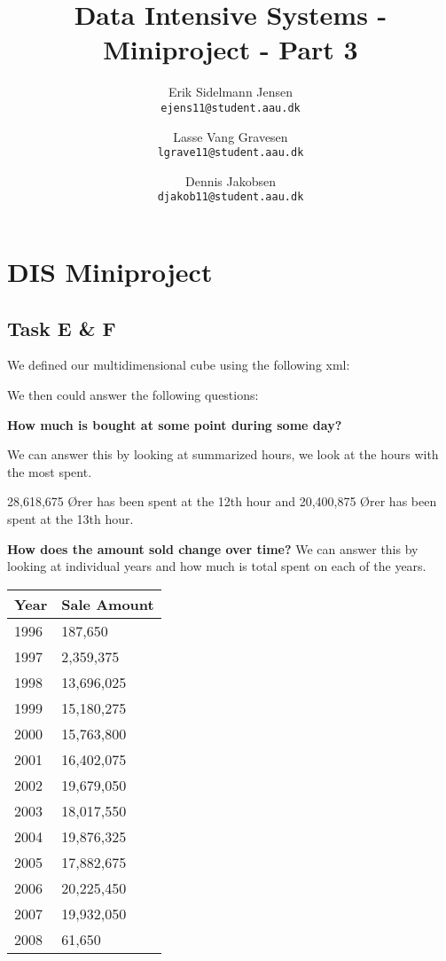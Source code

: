 
\usepackage{subcaption}

\author{
  Erik Sidelmann Jensen\\
  \texttt{ejens11@student.aau.dk}
  \and
  Lasse Vang Gravesen\\
  \texttt{lgrave11@student.aau.dk}
  \and
  Dennis Jakobsen\\
  \texttt{djakob11@student.aau.dk}  
}

\title{Data Intensive Systems - Miniproject - Part 3}
\date{}


	\clearpage\maketitle
	\thispagestyle{empty}
	
	\chapter{DIS Miniproject}
	\section{Task E \& F}
	We defined our multidimensional cube using the following xml:
	
	
	We then could answer the following questions:
	
	\textbf{How much is bought at some point during some day?}
	
	We can answer this by looking at summarized hours, we look at the hours with the most spent.
	
	28,618,675 Ører has been spent at the 12th hour and 20,400,875 Ører has been spent at the 13th hour.
	
	\textbf{How does the amount sold change over time?}
	We can answer this by looking at individual years and how much is total spent on each of the years.
	\begin{table}[H]
	    \begin{tabular}{l|l}
	    Year & Sale Amount \\ \hline
	    1996 & 187,650     \\
	    1997 & 2,359,375   \\
	    1998 & 13,696,025  \\
	    1999 & 15,180,275  \\
	    2000 & 15,763,800  \\
	    2001 & 16,402,075  \\
	    2002 & 19,679,050  \\
	    2003 & 18,017,550  \\
	    2004 & 19,876,325  \\
	    2005 & 17,882,675  \\
	    2006 & 20,225,450  \\
	    2007 & 19,932,050  \\
	    2008 & 61,650      \\
	    \end{tabular}
	\end{table}
	
